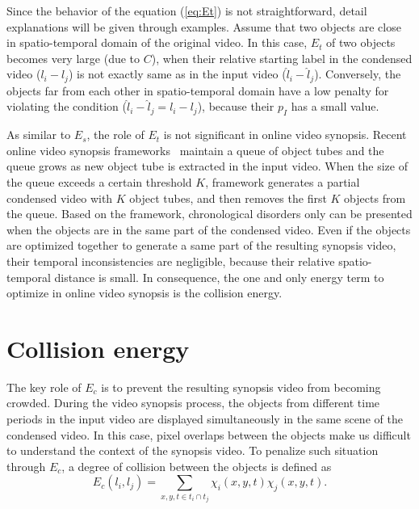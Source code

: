 \documentclass[11pt]{hyu_thesis}
\begin{document}
Since the behavior of the equation (\ref{eq:Et}) is not straightforward, detail explanations will be given through examples. Assume that two objects are close in spatio-temporal domain of the original video. In this case, $E_t$ of two objects becomes very large (due to $C$), when their relative starting label in the condensed video ($l_i - l_j$) is not exactly same as in the input video ($\hat{l}_i - \hat{l}_j$). Conversely, the objects far from each other in spatio-temporal domain have a low penalty for violating the condition ($\hat{l}_i - \hat{l}_j = l_i - l_j$), because their $p_I$ has a small value.

As similar to $E_s$, the role of $E_t$ is not significant in online video synopsis. Recent online video synopsis frameworks~\cite{} maintain a queue of object tubes and the queue grows as new object tube is extracted in the input video. When the size of the queue exceeds a certain threshold $K$, framework generates a partial condensed video with $K$ object tubes, and then removes the first $K$ objects from the queue. Based on the framework, chronological disorders only can be presented when the objects are in the same part of the condensed video. Even if the objects are optimized together to generate a same part of the resulting synopsis video, their temporal inconsistencies are negligible, because their relative spatio-temporal distance is small. In consequence, the one and only energy term to optimize in online video synopsis is the collision energy.

\section{Collision energy}
The key role of $E_c$ is to prevent the resulting synopsis video from becoming crowded. During the video synopsis process, the objects from different time periods in the input video are displayed simultaneously in the same scene of the condensed video. In this case, pixel overlaps between the objects make us difficult to understand the context of the synopsis video. To penalize such situation through $E_c$, a degree of collision between the objects is defined as
\begin{equation}
\label{eq:Ec}
E_c(l_i,l_j)=\sum_{x,y,t \in t_i \cap t_j} \chi_i(x,y,t) \chi_j(x,y,t).
\end{equation}
\end{document}
